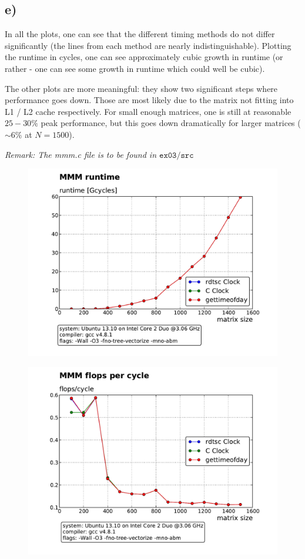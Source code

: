 \documentclass[11pt]{article}
\begin{document}
	\subsection*{e)}
		In all the plots, one can see that the different timing methods do not differ significantly (the lines from each method are nearly indistinguishable).
		Plotting the runtime in cycles, one can see approximately cubic growth in runtime (or rather - one can see some growth in runtime which could well be cubic). \par
		The other plots are more meaningful: they show two significant steps where performance goes down. Those are most likely due to the matrix not fitting into L1 / L2 cache respectively. For small enough matrices, one is still at reasonable $25 - 30 \%$ peak performance, but this goes down dramatically for larger matrices ($\sim  6\%$ at $N = 1500$).\par 
		\emph{Remark: The mmm.c file is to be found in $\mathtt{ex03/src}$}
			\begin{figure}[H]
				\includegraphics[width = 6in]{MMM_runtimeO3.pdf}
			\end{figure}
			\begin{figure}[H]
				\includegraphics[width = 6in]{MMM_flopsO3.pdf}
			\end{figure}
\end{document}
